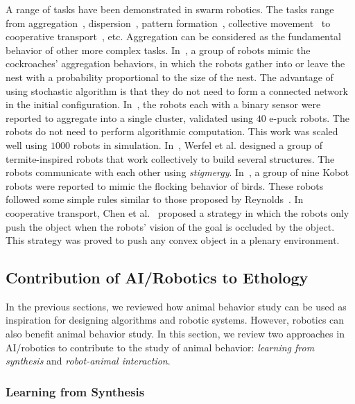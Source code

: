 A range of tasks have been demonstrated in swarm robotics. The tasks range from aggregation~\cite{Trianni:LNCS:2003, Gauci2014_ijrr, Garnier:AL:2008, Jeanson:AB:2005}, dispersion~\cite{howard2002mobile, mclurkin2004distributed}, pattern formation~\cite{Fujibayashi:DARS:2002, Chen:AAMAS:2012}, collective movement~\cite{Turgut:SI:2008} to cooperative transport~\cite{Kube:AB:1993, Kube:RAS:2000,Gross:IJBC:2009, Jianing:TRO:2015}, etc. Aggregation can be considered as the fundamental behavior of other more complex tasks. In~\cite{Jeanson:AB:2005}, a group of robots mimic the cockroaches' aggregation behaviors, in which the robots gather into or leave the nest with a probability proportional to the size of the nest. The advantage of using stochastic algorithm is that they do not need to form a connected network in the initial configuration. In~\cite{Gauci2014_ijrr}, the robots each with a binary sensor were reported to aggregate into a single cluster, validated using $40$ e-puck robots. The robots do not need to perform algorithmic computation. This work was scaled well using $1000$ robots in simulation. In~\cite{Werfel:Sci:2014}, Werfel et al. designed a group of termite-inspired robots that work collectively to build several structures. The robots communicate with each other using \textit{stigmergy}. In~\cite{Turgut:SI:2008}, a group of nine Kobot robots were reported to mimic the flocking behavior of birds. These robots followed some simple rules similar to those proposed by Reynolds~\cite{Craig:CG:1987}. In cooperative transport, Chen et al.~\cite{Jianing:TRO:2015} proposed a strategy in which the robots only push the object when the robots' vision of the goal is occluded by the object. This strategy was proved to push any convex object in a plenary environment. 

\subsection{Contribution of AI/Robotics to Ethology}\label{sec:contribution_of_AI/robotics_to_ethology}

In the previous sections, we reviewed how animal behavior study can be used as inspiration for designing algorithms and robotic systems. However, robotics can also benefit animal behavior study. In this section, we review two approaches in AI/robotics to contribute to the study of animal behavior: \textit{learning from synthesis} and \textit{robot-animal interaction}.

\subsubsection{Learning from Synthesis}


